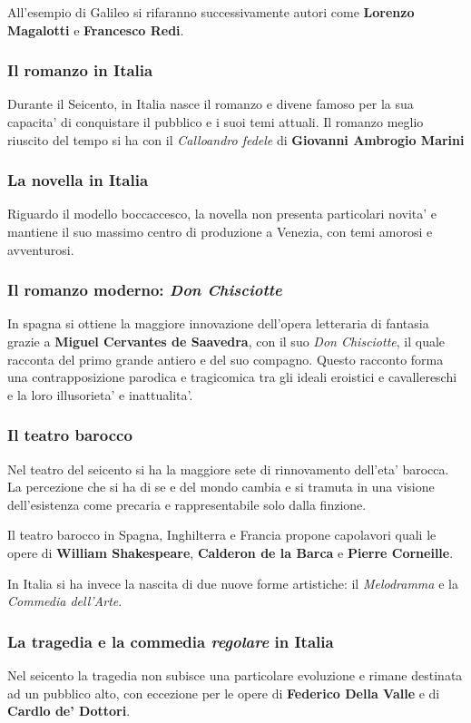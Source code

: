 \documentclass{article}
\begin{document}
{    All'esempio di Galileo si rifaranno successivamente autori come \textbf{Lorenzo Magalotti} e \textbf{Francesco Redi}.

    \subsubsection{Il romanzo in Italia}
    Durante il Seicento, in Italia nasce il romanzo e divene famoso per la sua capacita' di conquistare il pubblico e i suoi temi attuali. Il romanzo meglio riuscito del tempo si ha con il \textit{Calloandro fedele} di \textbf{Giovanni Ambrogio Marini}

    \subsubsection{La novella in Italia}
    Riguardo il modello boccaccesco, la novella non presenta particolari novita' e mantiene il suo massimo centro di produzione a Venezia, con temi amorosi e avventurosi.

    \subsubsection{Il romanzo moderno: \textit{Don Chisciotte}}
    In spagna si ottiene la maggiore innovazione dell'opera letteraria di fantasia grazie a \textbf{Miguel Cervantes de Saavedra}, con il suo \textit{Don Chisciotte}, il quale racconta del primo grande antiero e del suo compagno. Questo racconto forma una contrapposizione parodica e tragicomica tra gli ideali eroistici e cavallereschi e la loro illusorieta' e inattualita'.

    \subsubsection{Il teatro barocco}
    Nel teatro del seicento si ha la maggiore sete di rinnovamento dell'eta' barocca. La percezione che si ha di se e del mondo cambia e si tramuta in una visione dell'esistenza come precaria e rappresentabile solo dalla finzione.

    Il teatro barocco in Spagna, Inghilterra e Francia propone capolavori quali le opere di \textbf{William Shakespeare}, \textbf{Calderon de la Barca} e \textbf{Pierre Corneille}.

    In Italia si ha invece la nascita di due nuove forme artistiche: il \textit{Melodramma} e la \textit{Commedia dell'Arte}.

    \subsubsection{La tragedia e la commedia \textit{regolare} in Italia}
    Nel seicento la tragedia non subisce una particolare evoluzione e rimane destinata ad un pubblico alto, con eccezione per le opere di \textbf{Federico Della Valle} e di \textbf{Cardlo de' Dottori}.

}
\end{document}
